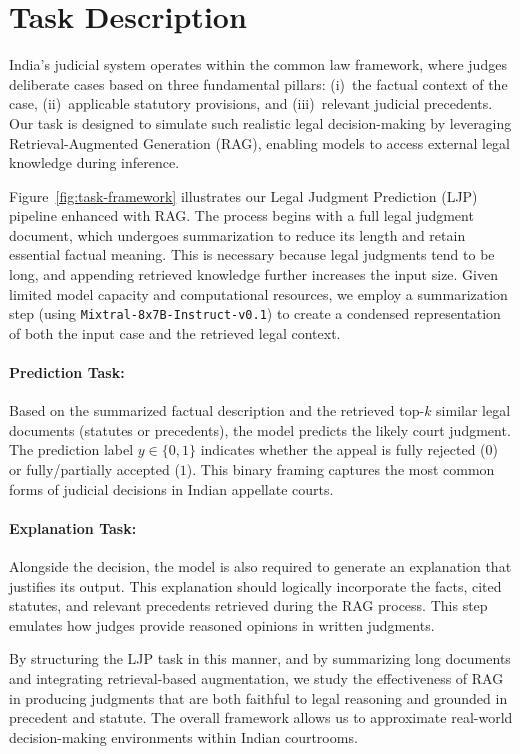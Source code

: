 \section{Task Description}
\label{sec:task_description}

India’s judicial system operates within the common law framework, where judges deliberate cases based on three fundamental pillars: (i)~the factual context of the case, (ii)~applicable statutory provisions, and (iii)~relevant judicial precedents. Our task is designed to simulate such realistic legal decision-making by leveraging Retrieval-Augmented Generation (RAG), enabling models to access external legal knowledge during inference.

Figure~\ref{fig:task-framework} illustrates our Legal Judgment Prediction (LJP) pipeline enhanced with RAG. The process begins with a full legal judgment document, which undergoes summarization to reduce its length and retain essential factual meaning. This is necessary because legal judgments tend to be long, and appending retrieved knowledge further increases the input size. Given limited model capacity and computational resources, we employ a summarization step (using \texttt{Mixtral-8x7B-Instruct-v0.1}) to create a condensed representation of both the input case and the retrieved legal context.

\paragraph{Prediction Task:} Based on the summarized factual description and the retrieved top-$k$ similar legal documents (statutes or precedents), the model predicts the likely court judgment. The prediction label \(y \in \{0, 1\}\) indicates whether the appeal is fully rejected ($0$) or fully/partially accepted ($1$). This binary framing captures the most common forms of judicial decisions in Indian appellate courts.

\paragraph{Explanation Task:} Alongside the decision, the model is also required to generate an explanation that justifies its output. This explanation should logically incorporate the facts, cited statutes, and relevant precedents retrieved during the RAG process. This step emulates how judges provide reasoned opinions in written judgments.

By structuring the LJP task in this manner, and by summarizing long documents and integrating retrieval-based augmentation, we study the effectiveness of RAG in producing judgments that are both faithful to legal reasoning and grounded in precedent and statute. The overall framework allows us to approximate real-world decision-making environments within Indian courtrooms.
